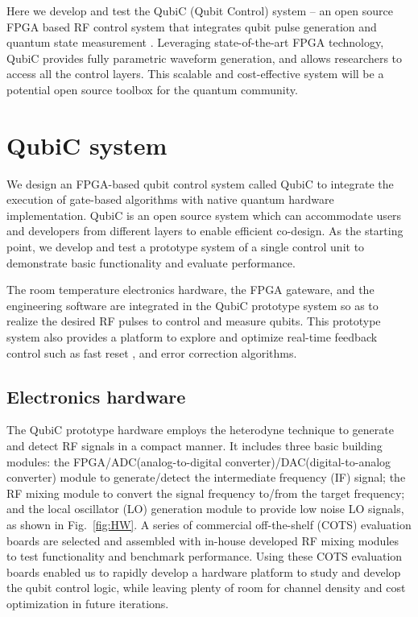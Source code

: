 \documentclass{ieeetran}
\begin{document}
Here we develop and test the QubiC (Qubit Control) system -- an open source FPGA based RF control system that integrates qubit pulse generation and quantum state measurement \cite{qubic2021repository}.
Leveraging state-of-the-art FPGA technology, QubiC provides fully parametric waveform generation, and allows researchers to access all the control layers.
This scalable and cost-effective system will be a potential open source toolbox for the quantum community.

\section{QubiC system}
We design an FPGA-based qubit control system called QubiC to integrate the execution of gate-based algorithms with native quantum hardware implementation.
QubiC is an open source system which can accommodate users and developers from different layers to enable efficient co-design.
As the starting point, we develop and test a prototype system of a single control unit to demonstrate basic functionality and evaluate performance. 

The room temperature electronics hardware, the FPGA gateware, and the engineering software are integrated in the QubiC prototype system so as to realize the desired RF pulses to control and measure qubits. 
This prototype system also provides a platform to explore and optimize real-time feedback control such as fast reset \cite{vijay2012stabilizing,riste2012feedback}, and error correction algorithms.%

\subsection{Electronics hardware}
The QubiC prototype hardware employs the heterodyne technique to generate and detect RF signals in a compact manner. 
It includes three basic building modules: the FPGA/ADC(analog-to-digital converter)/DAC(digital-to-analog converter) module to generate/detect the intermediate frequency (IF) signal; the RF mixing module to convert the signal frequency to/from the target frequency; and the local oscillator (LO) generation module to provide low noise LO signals, as shown in Fig.~\ref{fig:HW}.
A series of commercial off-the-shelf (COTS) evaluation boards are selected and assembled with in-house developed RF mixing modules to test functionality and benchmark performance.
Using these COTS evaluation boards enabled us to rapidly develop a hardware platform to study and develop the qubit control logic, while leaving plenty of room for channel density and cost optimization in future iterations.
\end{document}
